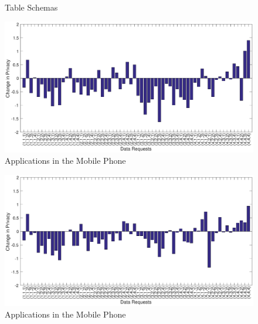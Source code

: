 \begin{figure}[htp]
\hspace{1em}
\caption{Table Schemas}
\label{fig:st3}
\end{figure}

\begin{figure}[ht!]
\centering
\includegraphics[width=\textwidth,keepaspectratio]{./images/day2_day1_privacy}
\caption{Applications in the Mobile Phone}
\label{fig:pre_q6}
\end{figure}

\begin{figure}[ht!]
\centering
\includegraphics[width=\textwidth,keepaspectratio]{./images/day3_day1_privacy}
\caption{Applications in the Mobile Phone}
\label{fig:pre_q6}
\end{figure}





